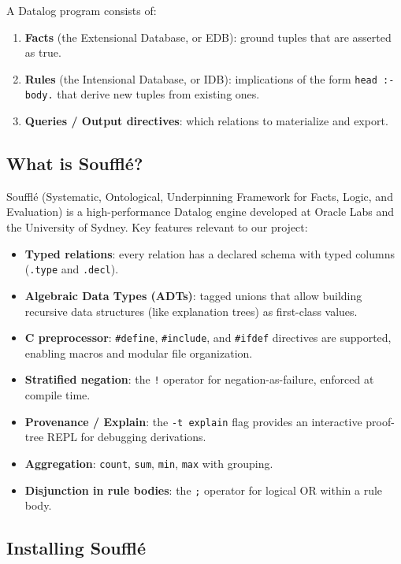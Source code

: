 \documentclass[11pt,letterpaper]{article}
\begin{document}
A Datalog program consists of:
\begin{enumerate}
  \item \textbf{Facts} (the Extensional Database, or EDB): ground tuples that are asserted as true.
  \item \textbf{Rules} (the Intensional Database, or IDB): implications of the form \texttt{head :- body.} that derive new tuples from existing ones.
  \item \textbf{Queries / Output directives}: which relations to materialize and export.
\end{enumerate}

\subsection{What is Souffl\'{e}?}

Souffl\'{e} (Systematic, Ontological, Underpinning Framework for Facts, Logic, and Evaluation) is a high-performance Datalog engine developed at Oracle Labs and the University of Sydney. Key features relevant to our project:

\begin{itemize}
  \item \textbf{Typed relations}: every relation has a declared schema with typed columns (\texttt{.type} and \texttt{.decl}).
  \item \textbf{Algebraic Data Types (ADTs)}: tagged unions that allow building recursive data structures (like explanation trees) as first-class values.
  \item \textbf{C preprocessor}: \texttt{\#define}, \texttt{\#include}, and \texttt{\#ifdef} directives are supported, enabling macros and modular file organization.
  \item \textbf{Stratified negation}: the \texttt{!} operator for negation-as-failure, enforced at compile time.
  \item \textbf{Provenance / Explain}: the \texttt{-t explain} flag provides an interactive proof-tree REPL for debugging derivations.
  \item \textbf{Aggregation}: \texttt{count}, \texttt{sum}, \texttt{min}, \texttt{max} with grouping.
  \item \textbf{Disjunction in rule bodies}: the \texttt{;} operator for logical OR within a rule body.
\end{itemize}

\subsection{Installing Souffl\'{e}}
\end{document}

